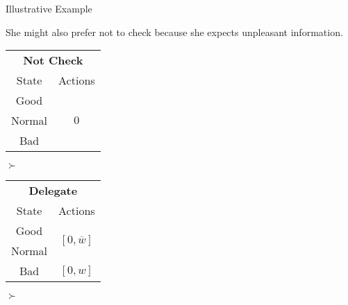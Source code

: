 \documentclass[usenames,dvipsnames,aspectratio=169,11pt, envcountsect, handout]{beamer}
\begin{document}
\begin{frame}[noframenumbering]{Illustrative Example}

	She might also prefer not to check because she expects unpleasant information.

	\vfill

	\begin{table}[H]
		\centering
		\begin{minipage}{0.29\textwidth}
			\centering
			\begin{tabular}{c | c}
				\multicolumn{2}{c}{\textbf{Not Check}} \\
				State  & Actions                       \\
				\hline
				Good   & \multirow{3}{*}{ \( 0 \)}     \\
				Normal &                               \\
				Bad    &                               \\
			\end{tabular}
			\vspace{0.5cm} %
		\end{minipage}\hspace{0.3cm} %
		\( \succ \) %
		\begin{minipage}{0.29\textwidth}
			\centering
			\begin{tabular}{c | c}
				\multicolumn{2}{c}{\textbf{Delegate}}                                                     \\
				State                & Actions                                                            \\
				\hline
				{\color{blue}Good}   & \multirow{2}{*}{{\color{blue}\( \left[0, \overline{w} \right] \)}} \\
				{\color{blue}Normal} &                                                                    \\
				Bad                  & \( \left[0, w \right]\)                                            \\
			\end{tabular}
			\vspace{0.5cm} %
		\end{minipage}\hspace{0.3cm} %
		\( \succ \) %
		\begin{minipage}{0.29\textwidth}

\end{minipage}
\end{table}
\end{frame}
\end{document}
